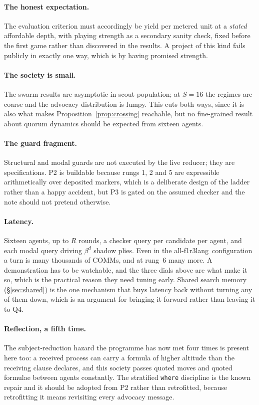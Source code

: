 \documentclass[11pt,a4paper]{article}
\theoremstyle{plain}
\theoremstyle{definition}
\theoremstyle{remark}
\newcommand{\flang}{\textsf{f1r3lang}}
\begin{document}
\paragraph{The honest expectation.} The evaluation criterion must accordingly be
yield per metered unit at a \emph{stated} affordable depth, with playing strength
as a secondary sanity check, fixed before the first game rather than discovered
in the results. A project of this kind fails publicly in exactly one way, which
is by having promised strength.

\paragraph{The society is small.} The swarm results are asymptotic in scout
population; at $S = 16$ the regimes are coarse and the advocacy distribution is
lumpy. This cuts both ways, since it is also what makes
Proposition~\ref{prop:crossing} reachable, but no fine-grained result about
quorum dynamics should be expected from sixteen agents.

\paragraph{The guard fragment.} Structural and modal guards are not executed by
the live reducer; they are specifications. P2 is buildable because rungs 1, 2
and 5 are expressible arithmetically over deposited markers, which is a
deliberate design of the ladder rather than a happy accident, but P3 is gated on
the assumed checker and the note should not pretend otherwise.

\paragraph{Latency.} Sixteen agents, up to $R$ rounds, a checker query per
candidate per agent, and each modal query driving $\beta^d$ shadow plies. Even
in the all-\flang\ configuration a turn is many thousands of COMMs, and at
rung~6 many more. A demonstration has to be watchable, and the three dials above are what make it
so, which is the practical reason they need tuning early. Shared search memory
(\S\ref{sec:shared}) is the one mechanism that buys latency back without
turning any of them down, which is an argument for bringing it forward rather
than leaving it to Q4.

\paragraph{Reflection, a fifth time.} The subject-reduction hazard the programme
has now met four times is present here too: a received process can carry a
formula of higher altitude than the receiving clause declares, and this society
passes quoted moves and quoted formulae between agents constantly. The
stratified \texttt{where} discipline is the known repair and it should be
adopted from P2 rather than retrofitted, because retrofitting it means revisiting
every advocacy message.
\end{document}
